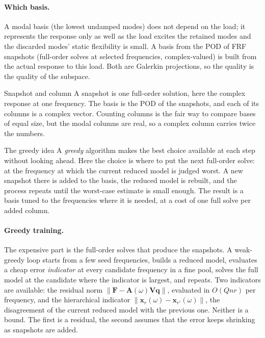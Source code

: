 \paragraph{Which basis.}
A modal basis (the lowest undamped modes) does not depend on the load; it represents the response only as well as the load excites the retained modes and the discarded modes' static flexibility is small. A basis from the POD of FRF snapshots (full-order solves at selected frequencies, complex-valued) is built from the actual response to this load. Both are Galerkin projections, so the quality is the quality of the subspace.

\begin{sidenote}{Snapshot and column}
A snapshot is one full-order solution, here the complex response at one frequency. The basis is the POD of the snapshots, and each of its columns is a complex vector. Counting columns is the fair way to compare bases of equal size, but the modal columns are real, so a complex column carries twice the numbers.
\end{sidenote}

\begin{sidenote}{The greedy idea}
A \emph{greedy} algorithm makes the best choice available at each step without looking ahead. Here the choice is where to put the next full-order solve: at the frequency at which the current reduced model is judged worst. A new snapshot there is added to the basis, the reduced model is rebuilt, and the process repeats until the worst-case estimate is small enough. The result is a basis tuned to the frequencies where it is needed, at a cost of one full solve per added column.
\end{sidenote}

\paragraph{Greedy training.}
The expensive part is the full-order solves that produce the snapshots. A weak-greedy loop starts from a few seed frequencies, builds a reduced model, evaluates a cheap error \emph{indicator} at every candidate frequency in a fine pool, solves the full model at the candidate where the indicator is largest, and repeats. Two indicators are available: the residual norm $\|\bm F-\bm A(\omega)\bm V\bm q\|$, evaluated in $O(Qnr)$ per frequency, and the hierarchical indicator $\|\bm x_r(\omega)-\bm x_{r'}(\omega)\|$, the disagreement of the current reduced model with the previous one. Neither is a bound. The first is a residual, the second assumes that the error keeps shrinking as snapshots are added.

